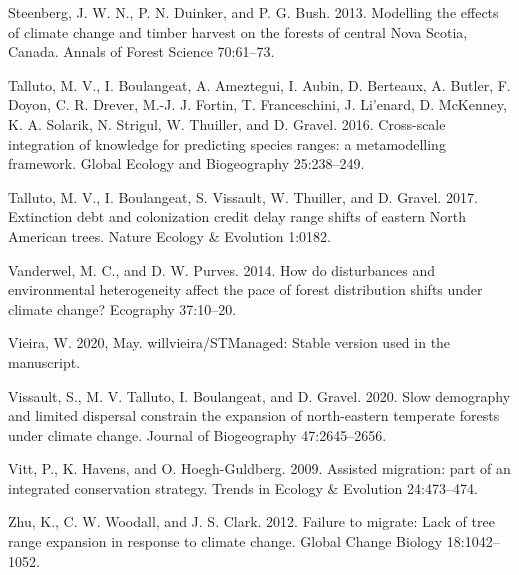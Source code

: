 \documentclass[12pt]{article}
\newlength{\cslhangindent}
\newenvironment{cslreferences}%
  {\setlength{\parindent}{0pt}%
  \everypar{\setlength{\hangindent}{\cslhangindent}}\ignorespaces}%
  {\par}
\begin{document}
\begin{cslreferences}
\leavevmode\hypertarget{ref-Steenberg2013}{}%
Steenberg, J. W. N., P. N. Duinker, and P. G. Bush. 2013. Modelling the
effects of climate change and timber harvest on the forests of central
Nova Scotia, Canada. Annals of Forest Science 70:61--73.

\leavevmode\hypertarget{ref-talluto2016}{}%
Talluto, M. V., I. Boulangeat, A. Ameztegui, I. Aubin, D. Berteaux, A.
Butler, F. Doyon, C. R. Drever, M.-J. J. Fortin, T. Franceschini, J.
Li\a'enard, D. McKenney, K. A. Solarik, N. Strigul, W. Thuiller, and D.
Gravel. 2016. Cross-scale integration of knowledge for predicting
species ranges: a metamodelling framework. Global Ecology and
Biogeography 25:238--249.

\leavevmode\hypertarget{ref-Talluto2017}{}%
Talluto, M. V., I. Boulangeat, S. Vissault, W. Thuiller, and D. Gravel.
2017. Extinction debt and colonization credit delay range shifts of
eastern North American trees. Nature Ecology \& Evolution 1:0182.

\leavevmode\hypertarget{ref-Vanderwel2014}{}%
Vanderwel, M. C., and D. W. Purves. 2014. How do disturbances and
environmental heterogeneity affect the pace of forest distribution
shifts under climate change? Ecography 37:10--20.

\leavevmode\hypertarget{ref-STManaged2020}{}%
Vieira, W. 2020, May. willvieira/STManaged: Stable version used in the
manuscript.

\leavevmode\hypertarget{ref-Vissault2020}{}%
Vissault, S., M. V. Talluto, I. Boulangeat, and D. Gravel. 2020. Slow
demography and limited dispersal constrain the expansion of
north-eastern temperate forests under climate change. Journal of
Biogeography 47:2645--2656.

\leavevmode\hypertarget{ref-Vila2010}{}%
Vitt, P., K. Havens, and O. Hoegh-Guldberg. 2009. Assisted migration:
part of an integrated conservation strategy. Trends in Ecology \&
Evolution 24:473--474.

\leavevmode\hypertarget{ref-Zhu2012}{}%
Zhu, K., C. W. Woodall, and J. S. Clark. 2012. Failure to migrate: Lack
of tree range expansion in response to climate change. Global Change
Biology 18:1042--1052.
\end{cslreferences}


\newpage
\end{document}
